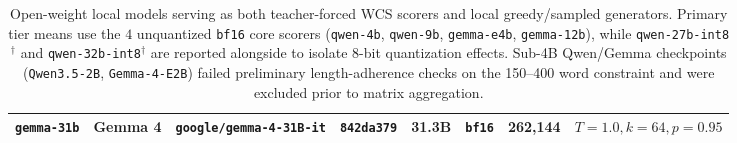 \documentclass[11pt]{article}
\begin{document}
\begin{table}[t]
{\begin{tabular}{llllrrll}
\texttt{gemma-31b} & Gemma 4 & \texttt{google/gemma-4-31B-it} & \texttt{842da379} & 31.3B & \texttt{bf16} & 262,144 & $T=1.0, k=64, p=0.95$ \\
\bottomrule
\end{tabular}%
}
\caption{Open-weight local models serving as both teacher-forced WCS scorers and local greedy/sampled generators. Primary tier means use the $4$ unquantized \texttt{bf16} core scorers (\texttt{qwen-4b}, \texttt{qwen-9b}, \texttt{gemma-e4b}, \texttt{gemma-12b}), while \texttt{qwen-27b-int8}$^\dagger$ and \texttt{qwen-32b-int8}$^\dagger$ are reported alongside to isolate 8-bit quantization effects. Sub-4B Qwen/Gemma checkpoints (\texttt{Qwen3.5-2B}, \texttt{Gemma-4-E2B}) failed preliminary length-adherence checks on the 150--400 word constraint and were excluded prior to matrix aggregation.}
\label{tab:local_models}
\end{table}

\begin{table}[t]
\centering
\small
{}
\caption{Frontier Proprietary ($3$) and Large Open-Weight ($7$) source generators queried via OpenRouter API ($T=1.0, p=0.95$, reasoning traces excluded; $50/50$ complete responses on both HC3 ELI5 and Wikipedia CS/AI).}
\label{tab:frontier_models}
\end{table}
\end{document}
